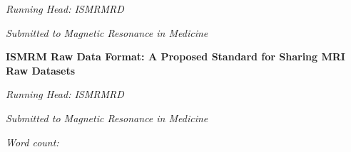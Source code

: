 \documentclass[12pt]{article}
\begin{document}
\textit{Running Head:  ISMRMRD}

\vspace{5mm}

\textit{Submitted to Magnetic Resonance in Medicine} 

\newpage
\clearpage
{} %
\pagestyle{fancy}
\begin{center}
\vspace*{70mm}
\large \textbf{ISMRM Raw Data Format: A Proposed Standard for Sharing MRI Raw Datasets} \\
\end{center}
\normalsize 

\textit{Running Head:  ISMRMRD}

\vspace{5mm}

\textit{Submitted to Magnetic Resonance in Medicine} 

\textit{Word count:  }  

\newpage
\clearpage
\doublespacing
\end{document}
